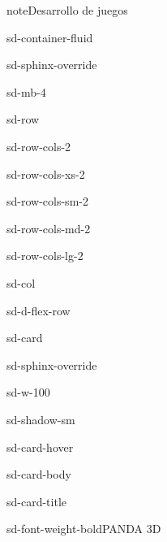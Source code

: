 \documentclass[letterpaper,10pt,spanish]{sphinxmanual}
\begin{document}
\begin{sphinxadmonition}{note}{Desarrollo de juegos}
\begin{sphinxuseclass}{sd-container-fluid}
\begin{sphinxuseclass}{sd-sphinx-override}
\begin{sphinxuseclass}{sd-mb-4}
\begin{sphinxuseclass}{sd-row}
\begin{sphinxuseclass}{sd-row-cols-2}
\begin{sphinxuseclass}{sd-row-cols-xs-2}
\begin{sphinxuseclass}{sd-row-cols-sm-2}
\begin{sphinxuseclass}{sd-row-cols-md-2}
\begin{sphinxuseclass}{sd-row-cols-lg-2}
\begin{sphinxuseclass}{sd-col}
\begin{sphinxuseclass}{sd-d-flex-row}
\begin{sphinxuseclass}{sd-card}
\begin{sphinxuseclass}{sd-sphinx-override}
\begin{sphinxuseclass}{sd-w-100}
\begin{sphinxuseclass}{sd-shadow-sm}
\begin{sphinxuseclass}{sd-card-hover}
\begin{sphinxuseclass}{sd-card-body}
\begin{sphinxuseclass}{sd-card-title}
\begin{sphinxuseclass}{sd-font-weight-bold}PANDA 3D
\end{sphinxuseclass}
\end{sphinxuseclass}
\end{sphinxuseclass}
\noindent{}
\end{sphinxuseclass}
\end{sphinxuseclass}
\end{sphinxuseclass}
\end{sphinxuseclass}
\end{sphinxuseclass}
\end{sphinxuseclass}
\end{sphinxuseclass}
\end{sphinxuseclass}
\end{sphinxuseclass}
\end{sphinxuseclass}
\end{sphinxuseclass}
\end{sphinxuseclass}
\end{sphinxuseclass}
\end{sphinxuseclass}
\end{sphinxuseclass}
\end{sphinxuseclass}\end{sphinxadmonition}
\end{document}
